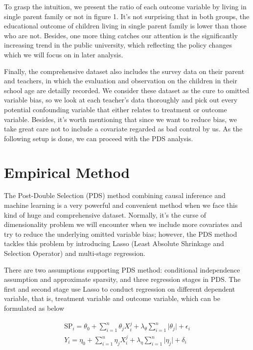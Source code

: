 \documentclass[]{AEA}
\begin{document}
    To grasp the intuition, we present the ratio of each outcome variable by living in single parent family or not in figure 1.  It's not surprising that in both groups, the educational outcome of children living in single parent family is lower than those who are not.  Besides, one more thing catches our attention is the significantly increasing trend in the public university, which reflecting the policy changes which we will focus on in later analysis.

    Finally, the comprehensive dataset also includes the survey data on their parent and teachers, in which the evaluation and observation on the children in their school age are detailly recorded.  We consider these dataset as the cure to omitted variable bias, so we look at each teacher's data thoroughly and pick out every potential confounding variable that either relates to treatment or outcome variable.  Besides, it's worth mentioning that since we want to reduce bias, we take great care not to include a covariate regarded as bad control by us.  As the following setup is done, we can proceed with the PDS analysis.


\section{Empirical Method} %

    The Post-Double Selection (PDS) method combining causal inference and machine learning is a very powerful and convenient method when we face this kind of huge and comprehensive dataset.  Normally, it's the curse of dimensionality problem we will encounter when we include more covariates and try to reduce the underlying omitted variable bias; however, the PDS method tackles this problem by introducing Lasso (Least Absolute Shrinkage and Selection Operator) and multi-stage regression.

    There are two assumptions supporting PDS method: conditional independence assumption and approximate sparsity, and three regression stages in PDS.  The first and second stage use Lasso to conduct regression on different dependent variable, that is, treatment variable and outcome variable, which can be formulated as below

    \begin{align}
    \text{SP}_i = \theta_0 + \sum_{i=1}^n \theta_j X_i^j + \lambda_\theta\sum_{i=1}^n \lvert \theta_j \rvert + \epsilon_i \\
    Y_i         = \eta_0   + \sum_{i=1}^n \eta_j X_i^j   + \lambda_\eta\sum_{i=1}^n \lvert \eta_j   \rvert + \delta_i
    \end{align}
\end{document}

